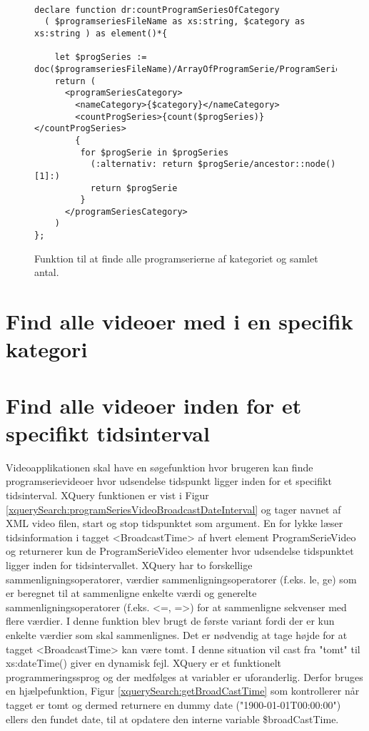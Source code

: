 \begin{figure}[ht]
\begin{lstlisting}[style=FAKE_XQUERY, language=XQUERY]

declare function dr:countProgramSeriesOfCategory
  ( $programseriesFileName as xs:string, $category as xs:string ) as element()*{
    
    let $progSeries := doc($programseriesFileName)/ArrayOfProgramSerie/ProgramSerie/Labels[string=$category]/..
    return (
      <programSeriesCategory>
        <nameCategory>{$category}</nameCategory>
        <countProgSeries>{count($progSeries)}</countProgSeries>
        {
         for $progSerie in $progSeries
           (:alternativ: return $progSerie/ancestor::node()[1]:)
           return $progSerie
         }
      </programSeriesCategory>
    )
};

\end{lstlisting}
\caption{Funktion til at finde alle programserierne af kategoriet og samlet antal.}
\label{xquerySearch:countProgramSeriesOfCategory}
\end{figure}


\section{Find alle videoer med i en specifik kategori}







\section{Find alle videoer inden for et specifikt tidsinterval}

Videoapplikationen skal have en søgefunktion hvor brugeren kan finde programserievideoer hvor udsendelse tidspunkt ligger inden for et specifikt tidsinterval. XQuery funktionen er vist i Figur \ref{xquerySearch:programSeriesVideoBroadcastDateInterval} og tager navnet af XML video filen, start og stop tidspunktet som argument. En for lykke læser tidsinformation i tagget <BroadcastTime> af hvert element ProgramSerieVideo og returnerer kun de ProgramSerieVideo elementer hvor udsendelse tidspunktet ligger inden for tidsintervallet. XQuery har to forskellige sammenligningsoperatorer, værdier sammenligningsoperatorer (f.eks. le, ge) som er beregnet til at sammenligne enkelte værdi og generelte sammenligningsoperatorer (f.eks. <=, =>) for at sammenligne sekvenser med flere værdier. I denne funktion blev brugt de første variant fordi der er kun enkelte værdier som skal sammenlignes. Det er nødvendig at tage højde for at tagget <BroadcastTime> kan være tomt. I denne situation vil cast fra "tomt" til xs:dateTime() giver en dynamisk fejl. XQuery er et funktionelt programmeringssprog og der medfølges at variabler er uforanderlig. Derfor bruges en hjælpefunktion, Figur \ref{xquerySearch:getBroadCastTime} som kontrollerer når tagget er tomt og dermed returnere en dummy date ("1900-01-01T00:00:00") ellers den fundet date, til at opdatere den interne variable \$broadCastTime.


